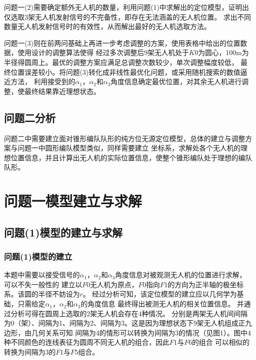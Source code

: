 \documentclass{ctexart}
\begin{document}
	\par 问题一(2)需要确定额外无人机的数量，利用问题(1)中求解出的定位模型，证明出仅选取3架无人机发射信号的不完备性，即存在无法涵盖的无人机位置。
	求出不同数量无人机发射信号时的有效性，从而解出最好的无人机选取方法。

	\par 问题一(3)则在前两问基础上再进一步考虑调整的方案，使用表格中给出的位置数据，使用设计的调整算法使得
	经过多次调整后9架无人机处于$K0$为圆心，100m为半径得圆周上。最优的调整方案应满足总调整次数较少，单次调整幅度较低，
	最终位置误差较小。将问题(3)转化成非线性最优化问题，或采用随机搜索的数值逼近方法，
	利用接受到的$\alpha_1$，$\alpha_2$和$\alpha_3$角度信息确定最优位置，对其余无人机进行调整，使最终结果靠近理想状态。

	\subsection{问题二分析}
	问题二中需要建立面对锥形编队队形的纯方位无源定位模型，总体的建立与调整方案与问题一中圆形编队模型类似，同样需要建立
	坐标系，求解处各个无人机的理想位置信息，并且计算出无人机的实际位置信息，使整个锥形编队处于理想的编队队形。

	\newpage
	\section{问题一模型建立与求解}
	\subsection{问题(1)模型的建立与求解}
	\subsubsection{问题(1)模型的建立}

	本题中需要以接受信号的$\alpha_1$，$\alpha_2$和$\alpha_3$角度信息对被观测无人机的位置进行求解，可以不失一般性的
	建立以$F0$无人机为原点，$F0$指向$F1$的方向为正半轴的极坐标系。该圆的半径不妨设为$r$。
	经过分析可知，该定位模型的建立应以几何学为基础，只需给定$\alpha_1$，$\alpha_2$和$\alpha_3$的角度信息
	最终得出被测无人机的相关位置信息。
	并通过分析可得在圆周上选取的2架无人机会存在4种情况。
	分别是两架无人机间间隔为0（架）、间隔为1、间隔为2、间隔为3。这是因为理想状态下9架无人机组成正九边形，由几何关系可知
	间隔为4的情形可以转换为间隔为3的情况（见图1）。图中4种不同颜色的连线表征为圆周不同无人机的组合，因此$F1$与$F6$的组合
	可以相似的转换为间隔为3的$F1$与$F5$组合。
	
\end{document}
